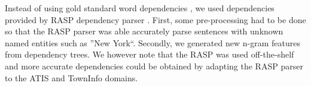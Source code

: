 \documentclass{article}
\begin{document}
Instead of using gold standard word dependencies \cite{kate08}, we used dependencies provided by RASP dependency parser \cite{rasp06}. First, some pre-processing had to be done so that the RASP parser was able accurately parse sentences with unknown named entities such as ''New York``. 
Secondly, we generated new n-gram features from dependency trees. 
We however note that the RASP was used off-the-shelf and more accurate dependencies could be obtained by adapting the RASP parser to the ATIS and TownInfo domains.

\end{document}
